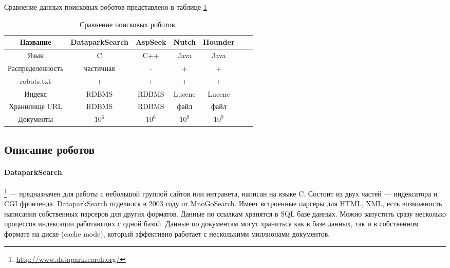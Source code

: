 Сравнение данных поисковых роботов представлено в таблице \ref{tab:crawlers}
\begin{table}[h]
\caption{\label{tab:crawlers}Сравнение поисковых роботов.}
\begin{center}
\begin{tabular}{|c|c|c|c|c|c|c|}

\hline
Название & DataparkSearch & AspSeek & Nutch & Hounder \\
\hline
Язык & C & C++ & Java & Java \\
\hline
Распределенность & частичная & - & + & + \\
\hline
robots.txt & + & + & + & + \\
\hline
Индекс & RDBMS & RDBMS & Lucene & Lucene \\
\hline
Хранилище URL & RDBMS & RDBMS & файл & файл \\
\hline
Документы & $10^{6}$ & $10^{6}$ & $10^{9}$ & $10^{9}$ \\
\hline

% 
\end{tabular}
\end{center}
\end{table}


\subsection{Описание роботов}
\paragraph{DataparkSearch}\footnote{\href{http://www.dataparksearch.org/}{http://www.dataparksearch.org/}} --- предназначен для работы с небольшой группой сайтов или интранета, написан на языке C. Состоит из двух частей --- индексатора и CGI фронтенда. DataparkSearch отделился в 2003 году от MnoGoSearch. Имеет встроенные парсеры для HTML, XML, есть возможность написания собственных парсеров для других форматов. Данные по ссылкам хранятся в SQL базе данных. Можно запустить сразу несколько процессов индексации работающих с одной базой. Данные по документам могут храниться как в базе данных, так и в собственном формате на диске (cache mode), который эффективно работает с несколькими миллионами документов.
